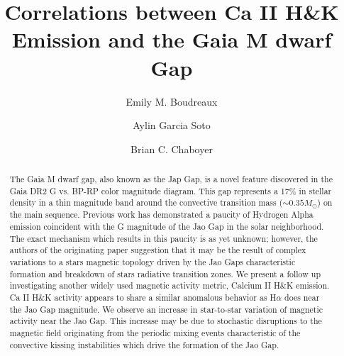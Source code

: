 \documentclass[twocolumn]{aastex62}
\begin{document}
\title{Correlations between Ca II H\&K Emission and the Gaia M dwarf Gap}


\author[0000-0002-2600-7513]{Emily M. Boudreaux}

\author[0000-0001-9828-3229]{Aylin Garcia Soto}

\author[0000-0003-3096-4161]{Brian C. Chaboyer}

\received{}
\revised{}
\revised{}
\accepted{}


\begin{abstract}

  The Gaia M dwarf gap, also known as the Jap Gap, is a novel feature
  discovered in the Gaia DR2 G vs. BP-RP color magnitude diagram. This gap
  represents a 17\% in stellar density in a thin magnitude band around the
  convective transition mass ($\sim 0.35 M_{\odot}$) on the main sequence.
  Previous work has demonstrated a paucity of Hydrogen
  Alpha emission coincident with the G magnitude of the Jao Gap in the solar
  neighborhood. The exact mechanism which results in this paucity is as yet
  unknown; however, the authors of the originating paper suggestion that it may
  be the result of complex variations to a stars magnetic topology driven by
  the Jao Gaps characteristic formation and breakdown of stars radiative
  transition zones. We present a follow up investigating another widely used
  magnetic activity metric, Calcium II H\&K emission. Ca II H\&K activity
  appears to share a similar anomalous behavior as H$\alpha$ does near the Jao
  Gap magnitude. We observe an increase in star-to-star variation of magnetic
  activity near the Jao Gap. This increase may be due to stochastic disruptions
  to the magnetic field originating from the periodic mixing events
  characteristic of the convective kissing instabilities which drive the
  formation of the Jao Gap.

\end{abstract}

\end{document}
